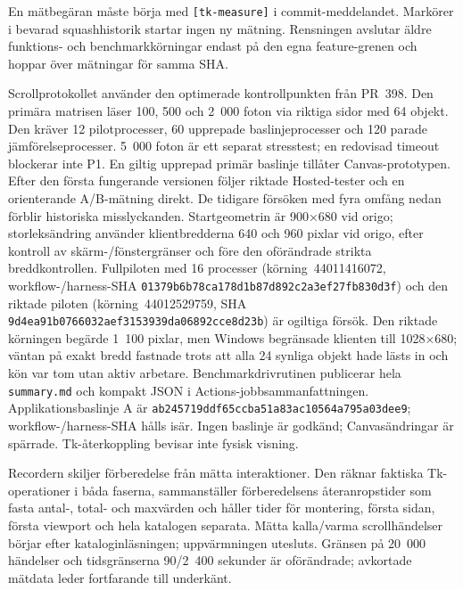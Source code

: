 \documentclass[11pt,a4paper]{article}
\newcommand{\codeword}[1]{\nolinkurl{#1}}
\begin{document}
En mätbegäran måste börja med \codeword{[tk-measure]} i commit-meddelandet.
Markörer i bevarad squashhistorik startar ingen ny mätning. Rensningen avslutar
äldre funktions- och benchmarkkörningar endast på den egna feature-grenen och
hoppar över mätningar för samma SHA.

Scrollprotokollet använder den optimerade kontrollpunkten från PR~398.
Den primära matrisen läser 100, 500 och 2~000 foton via riktiga sidor med
64 objekt. Den kräver 12 pilotprocesser, 60 upprepade baslinjeprocesser och
120 parade jämförelseprocesser. 5~000 foton är ett separat stresstest;
en redovisad timeout blockerar inte P1. En giltig upprepad primär baslinje
tillåter Canvas-prototypen. Efter den första fungerande versionen följer
riktade Hosted-tester och en orienterande A/B-mätning direkt.
De tidigare försöken med fyra omfång nedan förblir historiska misslyckanden. Startgeometrin är
900×680 vid origo; storleksändring använder klientbredderna 640 och 960
pixlar vid origo, efter kontroll av skärm-/fönstergränser och före den
oförändrade strikta breddkontrollen. Fullpiloten med 16 processer
(körning~44011416072, workflow-/harness-SHA
\codeword{01379b6b78ca178d1b87d892c2a3ef27fb830d3f}) och den riktade piloten
(körning~44012529759, SHA \codeword{9d4ea91b0766032aef3153939da06892cce8d23b})
är ogiltiga försök. Den riktade körningen begärde 1~100 pixlar, men Windows
begränsade klienten till 1028×680; väntan på exakt bredd fastnade trots att
alla 24 synliga objekt hade lästs in och kön var tom utan aktiv arbetare.
Benchmarkdrivrutinen publicerar hela \codeword{summary.md} och kompakt JSON
i Actions-jobbsammanfattningen. Applikationsbaslinje A är
\codeword{ab245719ddf65ccba51a83ac10564a795a03dee9}; workflow-/harness-SHA
hålls isär. Ingen baslinje är godkänd; Canvasändringar är spärrade.
Tk-återkoppling bevisar inte fysisk visning.

Recordern skiljer förberedelse från mätta interaktioner. Den räknar faktiska
Tk-operationer i båda faserna, sammanställer förberedelsens återanropstider
som fasta antal-, total- och maxvärden och håller tider för montering, första
sidan, första viewport och hela katalogen separata. Mätta kalla/varma
scrollhändelser börjar efter kataloginläsningen; uppvärmningen utesluts.
Gränsen på 20~000 händelser och tidsgränserna 90/2~400 sekunder är oförändrade;
avkortade mätdata leder fortfarande till underkänt.
\end{document}
